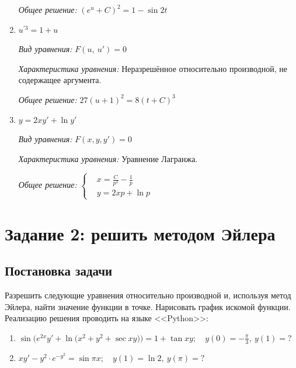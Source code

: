 \documentclass[14pt, titlepage, a4paper, fleqn]{extarticle}
\begin{document}
\begin{enumerate}
                        \textit{Общее решение:}
                            \(
                                (e^u + C)^2 = 1 - \sin{2t} 
                            \)

                \item \(u^{\prime 3} = 1 + u\)
                
                        \textit{Вид уравнения:} 
                            \(F(u, ~ u') = 0\)

                        \textit{Характеристика уравнения:}
                            Неразрешённое относительно производной, не содержащее аргумента.

                        \textit{Общее решение:}
                        \(27(u + 1)^2 = 8(t + C)^3\)

                \item \(y = 2xy' + \ln{y'}\)
                
                        \textit{Вид уравнения:}
                            \(F(x, y, y') = 0\)

                        \textit{Характеристика уравнения:}
                            Уравнение Лагранжа.

                        \textit{Общее решение:}
                            \(
                                \left\lbrace
                                    \begin{aligned}
                                            &x = \frac{C}{p^2} - \frac{1}{p}\\
                                            &y = 2xp + \ln{p}
                                    \end{aligned}
                                \right .     
                            \)
            \end{enumerate}

    \section{Задание 2: решить методом Эйлера}
        \subsection{Постановка задачи}
            Разрешить следующие уравнения относительно производной и, используя метод Эйлера, найти значение функции в точке. Нарисовать график искомой функции. Реализацию решения проводить на языке <<Python>>:

            \begin{enumerate}
                \item \(\displaystyle
                    \sin\Big( e^{2x}y' + \ln\big(x^2 + y^2 + \sec{xy}\big) \Big)
                     = 1 + \tan{xy}; \quad y(0) = -\frac{\pi}{3}, ~ y(1) = ?
                \)  
                
                \item \(
                    xy' - y^2 \cdot e^{-y^2} = \sin{\pi x}; \quad y(1) = \ln{2}, 
                    ~ y(\pi) = ?
                \)
            \end{enumerate}
\end{document}
